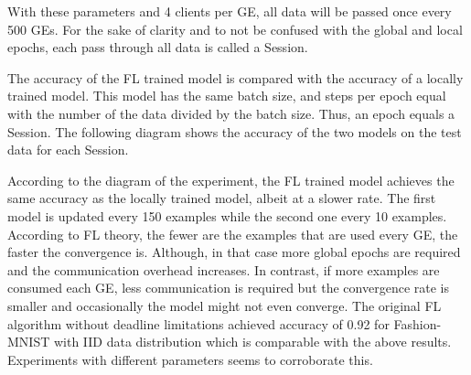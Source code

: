 With these parameters and 4 clients per GE, all data will be passed once every 500 GEs. For the sake of clarity and to not be confused with the global and local epochs, each pass through all data is called a Session.

\medskip
The accuracy of the FL trained model is compared with the accuracy of a locally trained model. This model has the same batch size, and steps per epoch equal with the number of the data divided by the batch size. Thus, an epoch equals a Session. The following diagram shows the accuracy of the two models on the test data for each Session.

\begin{center}
\end{center}

\medskip
According to the diagram of the experiment, the FL trained model achieves the same accuracy as the locally trained model, albeit at a slower rate. The first model is updated every 150 examples while the second one every 10 examples. According to FL theory, the fewer are the examples that are used every GE, the faster the convergence is. Although, in that case more global epochs are required and the communication overhead increases. In contrast, if more examples are consumed each GE, less communication is required but the convergence rate is smaller and occasionally the model might not even converge. The original FL algorithm without deadline limitations achieved accuracy of 0.92 for Fashion-MNIST with IID data distribution which is comparable with the above results. Experiments with different parameters seems to corroborate this.


